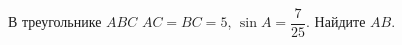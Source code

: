 \begin{ex}
	\begin{condition}
		В треугольнике \( ABC \) \(AC=BC=5\),  \( \sin A=\dfrac{7}{25} \).  Найдите \( AB \).
	\end{condition}
\end{ex}